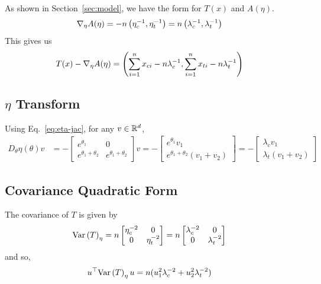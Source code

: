 \documentclass[10pt, a4paper]{article}
\begin{document}
As shown in Section~\ref{sec:model},
we have the form for $T(x)$ and $A(\eta)$.
\begin{align*}
    \nabla_\eta A(\eta)
    &=
    -n \left(\eta_c^{-1}, \eta_t^{-1}\right)
    =
    n \left(\lambda_c^{-1}, \lambda_t^{-1}\right)
\end{align*}
This gives us
\begin{align*}
    T(x) - \nabla_\eta A(\eta)
    &=
    \paren{%
        \sum\limits_{i=1}^n x_{ci} - n\lambda_c^{-1},
        \sum\limits_{i=1}^n x_{ti} - n\lambda_t^{-1}
    }
\end{align*}

\subsection{$\eta$ Transform}

Using Eq.~\ref{eq:eta-jac},
for any $v \in \mathbb{R}^d$,
\begin{align*}
    D_\theta \eta(\theta) v 
    &=
    -
    \begin{bmatrix}
        e^{\theta_1} & 0 \\
        e^{\theta_1+\theta_2} & e^{\theta_1+\theta_2} 
    \end{bmatrix}
    v
    =
    -
    \begin{bmatrix}
        e^{\theta_1} v_1 \\
        e^{\theta_1+\theta_2} (v_1+v_2)
    \end{bmatrix}
    =
    -
    \begin{bmatrix}
        \lambda_c v_1 \\
        \lambda_t (v_1+v_2)
    \end{bmatrix}
\end{align*}

\subsection{Covariance Quadratic Form}

The covariance of $T$ is given by 
\begin{align}
    \text{Var}\left(T\right)_\eta &= 
    n
    \begin{bmatrix}
        \eta_c^{-2} & 0 \\
        0 & \eta_t^{-2}
    \end{bmatrix}
    =
    n
    \begin{bmatrix}
        \lambda_c^{-2} & 0 \\
        0 & \lambda_t^{-2}
    \end{bmatrix}
    \label{eq:t-cov}
\end{align}
and so,
\begin{align*}
    u^\top \text{Var}\left(T\right)_\eta u &=
    n (u_1^2 \lambda_c^{-2} + u_2^2 \lambda_t^{-2})
\end{align*}
\end{document}
